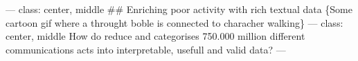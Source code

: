 \documentclass[ignorenonframetext,]{beamer}
\begin{document}
\begin{frame}
--- class: center, middle \#\# Enriching poor activity with rich textual
data \{Some cartoon gif where a throught boble is connected to characher
walking\} --- class: center, middle How do reduce and categorises
750.000 million different communications acts into interpretable,
usefull and valid data? ---

\end{frame}
\end{document}
